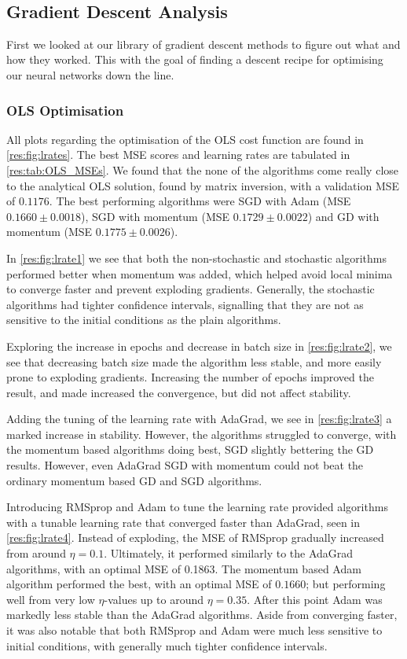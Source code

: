 \\

\subsection{Gradient Descent Analysis}
    First we looked at our library of gradient descent methods to figure out what and how they worked. This with the goal of finding a descent recipe for optimising our neural networks down the line.
    
    \subsubsection{OLS Optimisation}
        All plots regarding the optimisation of the OLS cost function are found in \cref{res:fig:lrates}. The best MSE scores and learning rates are tabulated in \cref{res:tab:OLS_MSEs}. We found that the none of the algorithms come really close to the analytical OLS solution, found by matrix inversion, with a validation MSE of $0.1176$. The best performing algorithms were SGD with Adam (MSE $0.1660 \pm 0.0018$), SGD with momentum (MSE $0.1729 \pm 0.0022$) and GD with momentum (MSE $0.1775 \pm 0.0026$).

        In \cref{res:fig:lrate1} we see that both the non-stochastic and stochastic algorithms performed better when momentum was added, which helped avoid local minima to converge faster and prevent exploding gradients. Generally, the stochastic algorithms had tighter confidence intervals, signalling that they are not as sensitive to the initial conditions as the plain algorithms.

        Exploring the increase in epochs and decrease in batch size in \cref{res:fig:lrate2}, we see that decreasing batch size made the algorithm less stable, and more easily prone to exploding gradients. Increasing the number of epochs improved the result, and made increased the convergence, but did not affect stability.

        Adding the tuning of the learning rate with AdaGrad, we see in \cref{res:fig:lrate3} a marked increase in stability. However, the algorithms struggled to converge, with the momentum based algorithms doing best, SGD slightly bettering the GD results. However, even AdaGrad SGD with momentum could not beat the ordinary momentum based GD and SGD algorithms.

        Introducing RMSprop and Adam to tune the learning rate provided algorithms with a tunable learning rate that converged faster than AdaGrad, seen in \cref{res:fig:lrate4}. Instead of exploding, the MSE of RMSprop gradually increased from around $\eta=0.1$. Ultimately, it performed similarly to the AdaGrad algorithms, with an optimal MSE of 0.1863. The momentum based Adam algorithm performed the best, with an optimal MSE of $0.1660$; but performing well from very low $\eta$-values up to around $\eta=0.35$. After this point Adam was markedly less stable than the AdaGrad algorithms. Aside from converging faster, it was also notable that both RMSprop and Adam were much less sensitive to initial conditions, with generally much tighter confidence intervals. 

